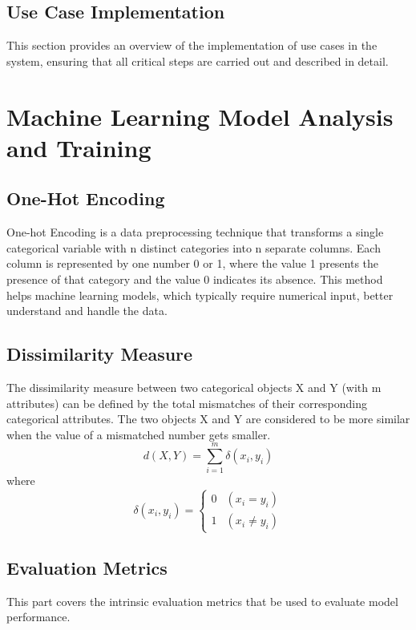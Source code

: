 \documentclass{article}
\begin{document}
\subsection{Use Case Implementation}
This section provides an overview of the implementation of use cases in the system, ensuring that
all critical steps are carried out and described in detail.

    
    
    

\section{Machine Learning Model Analysis and Training}
\subsection{One-Hot Encoding}
One-hot Encoding is a data preprocessing technique that transforms a single categorical variable with n distinct categories 
into n separate columns. Each column is represented by one number 0 or 1, where the value 1 presents the presence of that category 
and the value 0 indicates its absence.\citep{thuy2020optimize} This method helps machine learning models, which typically require numerical input, 
better understand and handle the data.

\subsection{Dissimilarity Measure}
The dissimilarity measure between two categorical objects X and Y (with m attributes) can be defined by the total mismatches of their corresponding categorical attributes. The two objects X and Y are considered to be more similar when the value of a mismatched number gets smaller.\citep{huang1998extensions}
        $$d(X,Y) = \sum_{i=1}^{m}\delta{(x_i,y_i)}$$ where $$\delta{(x_i,y_i)} = \left\{\begin{array}{ll} 0 & (x_i = y_i) \\
        1 & (x_i \neq y_i)\end{array}\right.$$

\subsection{Evaluation Metrics} \label{evaluation metrics}
This part covers the intrinsic evaluation metrics that be used to evaluate model performance.
\end{document}
